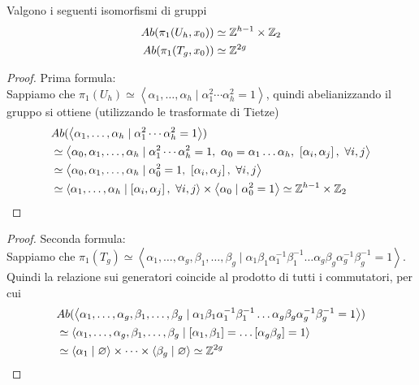 \begin{lemma}
	\label{lemm:abel_torus_proj}
	Valgono i seguenti isomorfismi di gruppi
	\begin{equation}
	\begin{aligned}
	 Ab(\pi_1(U_h, x_0)) & \simeq \mathbb{Z}^{h-1} \times \mathbb{Z}_2 \\
	 Ab(\pi_1(T_g, x_0)) & \simeq \mathbb{Z}^{2g}
	\end{aligned}
	\end{equation}  
\end{lemma}
\begin{proof} Prima formula:\\
	Sappiamo che $\pi_1(U_h) \simeq \left\langle \alpha_1, \dots, \alpha_h \mid \alpha^2_1 \cdots \alpha^2_h = 1\right\rangle$, quindi abelianizzando il gruppo si ottiene (utilizzando le trasformate di Tietze)
	\begin{equation}
	\begin{aligned}
		& Ab( \left\langle \alpha_1, \dots, \alpha_h \mid \alpha^2_1 \cdots \alpha^2_h = 1\right\rangle) \\
		& \simeq \left\langle \alpha_0, \alpha_1, \dots, \alpha_h \mid \alpha^2_1 \cdots \alpha^2_h = 1,\ \alpha_0 = \alpha_1 \dots \alpha_h,\ \left[\alpha_i, \alpha_j\right],\ \forall i,j \right\rangle\\
		& \simeq \left\langle \alpha_0, \alpha_1, \dots, \alpha_h \mid \alpha^2_0 = 1,\ \left[\alpha_i, \alpha_j\right],\ \forall i,j \right\rangle \\
		& \simeq \left\langle \alpha_1, \dots, \alpha_h \mid \left[\alpha_i, \alpha_j\right],\ \forall i,j \right\rangle \times \left\langle \alpha_0 \mid \alpha^2_0 = 1\right\rangle \simeq \mathbb{Z}^{h-1} \times \mathbb{Z}_2 
	\end{aligned}
	\end{equation}
\end{proof}
\begin{proof}Seconda formula:\\
	Sappiamo che $\pi_1(T_g) \simeq \left\langle \alpha_1, \dots, \alpha_g, \beta_1, \dots, \beta_g \mid \alpha_1 \beta_1\alpha^{-1}_1\beta^{-1}_1 \dots \alpha_g \beta_g\alpha^{-1}_g\beta^{-1}_g = 1\right\rangle$. Quindi la relazione sui generatori coincide al prodotto di tutti i commutatori, per cui 
	\begin{equation}
	\begin{aligned}
		& Ab(\left\langle \alpha_1, \dots, \alpha_g, \beta_1, \dots, \beta_g \mid \alpha_1 \beta_1\alpha^{-1}_1\beta^{-1}_1 \dots \alpha_g \beta_g\alpha^{-1}_g\beta^{-1}_g = 1\right\rangle) \\ & \simeq \left\langle \alpha_1, \dots, \alpha_g, \beta_1, \dots, \beta_g \mid \left[\alpha_1, \beta_1\right] = \dots \left[\alpha_g \beta_g\right] = 1\right\rangle\\
		& \simeq \left\langle \alpha_1 \mid \varnothing \right\rangle \times \dots \times \left\langle\beta_g \mid \varnothing \right\rangle \simeq \mathbb{Z}^{2g}
	\end{aligned}
	\end{equation}
\end{proof}

